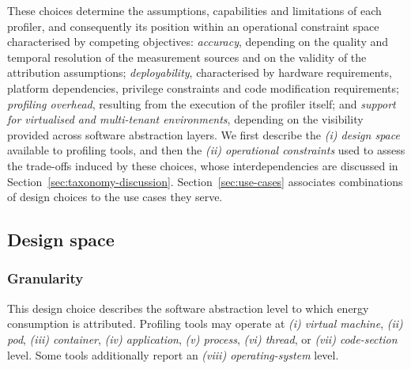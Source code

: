 \documentclass[
  acmsmall,
  screen,
  review,
  xcolor={dvipsnames,usenames}
]{acmart}
\begin{document}
These choices determine the assumptions, capabilities and limitations of each profiler, and consequently its position within an operational constraint space characterised by competing objectives: \emph{accuracy}, depending on the quality and temporal resolution of the measurement sources and on the validity of the attribution assumptions; \emph{deployability}, characterised by hardware requirements, platform dependencies, privilege constraints and code modification requirements; \emph{profiling overhead}, resulting from the execution of the profiler itself; and \emph{support for virtualised and multi-tenant environments}, depending on the visibility provided across software abstraction layers. We first describe the \emph{(i) design space} available to profiling tools, and then the \emph{(ii) operational constraints} used to assess the trade-offs induced by these choices, whose interdependencies are discussed in Section~\ref{sec:taxonomy-discussion}. Section~\ref{sec:use-cases} associates combinations of design choices to the use cases they serve.

\subsection{Design space}

\subsubsection{\textbf{Granularity}}

This design choice describes the software abstraction level to which energy consumption is attributed. Profiling tools may operate at \emph{(i) virtual machine}, \emph{(ii) pod}, \emph{(iii) container}, \emph{(iv) application}, \emph{(v) process}, \emph{(vi) thread}, or \emph{(vii) code-section} level. Some tools additionally report an \emph{(viii) operating-system} level.
\end{document}
